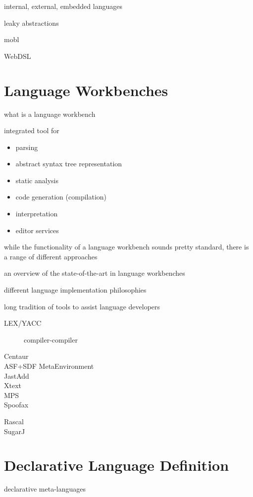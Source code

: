 internal, external, embedded languages

leaky abstractions

mobl \cite{HemelV11}

WebDSL \cite{HemelGKV11}

\section{Language Workbenches}

what is a language workbench

integrated tool for 

\begin{itemize}
  \item parsing
  \item abstract syntax tree representation
  \item static analysis
  \item code generation (compilation)
  \item interpretation
  \item editor services
\end{itemize}

while the functionality of a language workbench sounds pretty standard, there is
a range of different approaches 

an overview of the state-of-the-art in language workbenches \cite{ErdwegSV13}

different language implementation philosophies

long tradition of tools to assist language developers

\begin{description}
\item[LEX/YACC] compiler-compiler
\item[Centaur]
\item[ASF+SDF MetaEnvironment]
\item[JastAdd]
\item[Xtext]
\item[MPS]
\item[Spoofax] \cite{KatsV10}
\item[Rascal]
\item[SugarJ] 
\end{description}


\section{Declarative Language Definition}

declarative meta-languages


